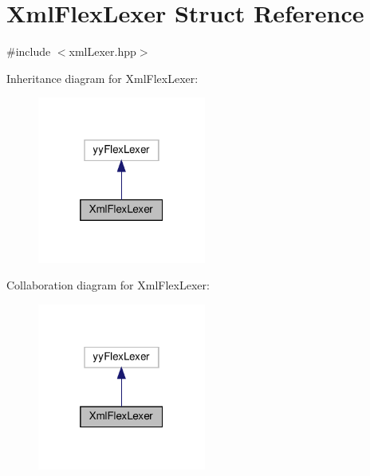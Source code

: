 \hypertarget{structXmlFlexLexer}{}\section{Xml\+Flex\+Lexer Struct Reference}
\label{structXmlFlexLexer}


{\ttfamily \#include $<$xml\+Lexer.\+hpp$>$}



Inheritance diagram for Xml\+Flex\+Lexer\+:
\nopagebreak
\begin{figure}[H]
\begin{center}
\leavevmode
\includegraphics[width=157pt]{d0/db3/structXmlFlexLexer__inherit__graph}
\end{center}
\end{figure}


Collaboration diagram for Xml\+Flex\+Lexer\+:
\nopagebreak
\begin{figure}[H]
\begin{center}
\leavevmode
\includegraphics[width=157pt]{d3/de8/structXmlFlexLexer__coll__graph}
\end{center}
\end{figure}
